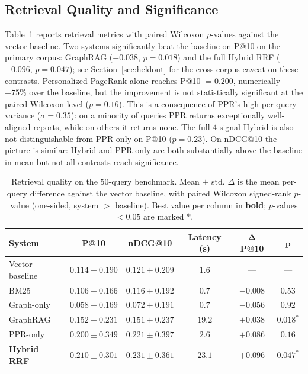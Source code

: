 \documentclass[10pt,a4paper]{article}
\begin{document}
\subsection{Retrieval Quality and Significance}

Table~\ref{tab:retrieval} reports retrieval metrics with paired
Wilcoxon $p$-values against the vector baseline. Two systems
significantly beat the baseline on P@10 on the primary corpus:
GraphRAG ($+0.038$, $p = 0.018$) and the full Hybrid RRF
($+0.096$, $p = 0.047$); see Section~\ref{sec:heldout} for the
cross-corpus caveat on these contrasts.
Personalized PageRank alone reaches P@10 $= 0.200$, numerically
$+75\%$ over the baseline, but the improvement is not statistically
significant at the paired-Wilcoxon level ($p = 0.16$). This is a
consequence of PPR's high per-query variance ($\sigma = 0.35$): on a
minority of queries PPR returns exceptionally well-aligned reports,
while on others it returns none. The full $4$-signal Hybrid is also
not distinguishable from PPR-only on P@10 ($p = 0.23$). On nDCG@10
the picture is similar: Hybrid and PPR-only are both substantially
above the baseline in mean but not all contrasts reach significance.

\begin{table}[t]
\centering
\small
\caption{Retrieval quality on the $50$-query benchmark. Mean $\pm$
std. $\Delta$ is the mean per-query difference against the vector
baseline, with paired Wilcoxon signed-rank $p$-value (one-sided,
system $>$ baseline). Best value per column in \textbf{bold};
$p$-values $< 0.05$ are marked $\ast$.}
\label{tab:retrieval}
\begin{tabular}{lccccc}
\toprule
\textbf{System} & \textbf{P@10} & \textbf{nDCG@10} & \textbf{Latency (s)} & $\boldsymbol{\Delta}$ \textbf{P@10} & $\boldsymbol{p}$ \\
\midrule
Vector baseline   & $0.114 \pm 0.190$ & $0.121 \pm 0.209$ & $1.6$ & ---     & --- \\
BM25              & $0.106 \pm 0.166$ & $0.116 \pm 0.192$ & $\mathbf{0.7}$ & $-0.008$ & $0.53$ \\
Graph-only        & $0.058 \pm 0.169$ & $0.072 \pm 0.191$ & $\mathbf{0.7}$ & $-0.056$ & $0.92$ \\
GraphRAG          & $0.152 \pm 0.231$ & $0.151 \pm 0.237$ & $19.2$  & $+0.038$ & $\mathbf{0.018}^{\ast}$ \\
PPR-only          & $0.200 \pm 0.349$ & $0.221 \pm 0.397$ & $2.6$   & $+0.086$ & $0.16$ \\
\textbf{Hybrid RRF} & $\mathbf{0.210 \pm 0.301}$ & $\mathbf{0.231 \pm 0.361}$ & $23.1$ & $+0.096$ & $\mathbf{0.047}^{\ast}$ \\
\bottomrule
\end{tabular}
\end{table}
\end{document}
